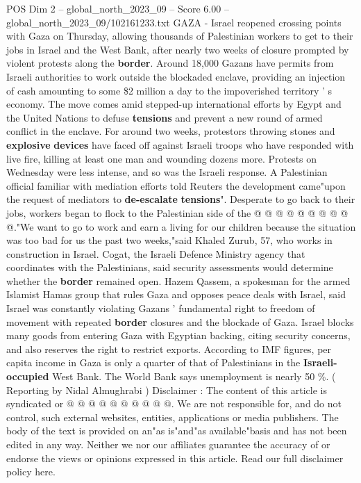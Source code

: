 \begin{textsample}{POS Dim 2 – global\_north\_2023\_09 – Score 6.00 – global\_north\_2023\_09/102161233.txt}  \label{ex:f2_pos_140}
GAZA - Israel reopened crossing points with Gaza on Thursday, allowing thousands of Palestinian workers to get to their jobs in Israel and the West Bank, after nearly two weeks of closure prompted by violent protests along the \textbf{border}.
Around 18,000 Gazans have permits from Israeli authorities to work outside the blockaded enclave, providing an injection of cash amounting to some \$2 million a day to the impoverished territory ' s economy.
The move comes amid stepped-up international efforts by Egypt and the United Nations to defuse \textbf{tensions} and prevent a new round of armed conflict in the enclave.
For around two weeks, protestors throwing stones and \textbf{explosive} \textbf{devices} have faced off against Israeli troops who have responded with live fire, killing at least one man and wounding dozens more.
Protests on Wednesday were less intense, and so was the Israeli response.
A Palestinian official familiar with mediation efforts told Reuters the development came"upon the request of mediators to \textbf{de-escalate} \textbf{tensions}".
Desperate to go back to their jobs, workers began to flock to the Palestinian side of the @ @ @ @ @ @ @ @ @ @."We want to go to work and earn a living for our children because the situation was too bad for us the past two weeks,"said Khaled Zurub, 57, who works in construction in Israel.
Cogat, the Israeli Defence Ministry agency that coordinates with the Palestinians, said security assessments would determine whether the \textbf{border} remained open.
Hazem Qassem, a spokesman for the armed Islamist Hamas group that rules Gaza and opposes peace deals with Israel, said Israel was constantly violating Gazans ' fundamental right to freedom of movement with repeated \textbf{border} closures and the blockade of Gaza.
Israel blocks many goods from entering Gaza with Egyptian backing, citing security concerns, and also reserves the right to restrict exports.
According to IMF figures, per capita income in Gaza is only a quarter of that of Palestinians in the \textbf{Israeli-occupied} West Bank.
The World Bank says unemployment is nearly 50 \%. ( Reporting by Nidal Almughrabi ) Disclaimer : The content of this article is syndicated or @ @ @ @ @ @ @ @ @ @.
We are not responsible for, and do not control, such external websites, entities, applications or media publishers.
The body of the text is provided on an"as is"and"as available"basis and has not been edited in any way.
Neither we nor our affiliates guarantee the accuracy of or endorse the views or opinions expressed in this article.
Read our full disclaimer policy here.

\end{textsample}
